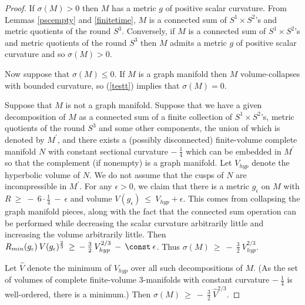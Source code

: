 \begin{proof}
If $\sigma(M) > 0$ then $M$ has a metric $g$ of positive scalar curvature.
From Lemmas \ref{pscempty} and \ref{finitetime}, $M$ is a connected sum of $S^1 \times S^2$'s and
metric quotients of the round $S^3$.
Conversely, if $M$ is a connected sum of $S^1 \times S^2$'s and
metric quotients of the round $S^3$ then $M$ admits a metric $g$ of
positive scalar curvature and so $\sigma(M) > 0$.

Now suppose that $\sigma(M) \le 0$.
If $M$ is a graph manifold then $M$ volume-collapses with bounded
curvature, so (\ref{testt}) implies that $\sigma(M) = 0$.

Suppose that $M$ is not a graph manifold. Suppose that we have
a given decomposition of $M$
as a connected sum
of a finite collection of $S^1 \times S^2$'s, metric quotients of the round
$S^3$ and some other components, the union of which is denoted by
$M^\prime$, and there exists a (possibly disconnected) finite-volume complete
manifold $N$ with constant sectional curvature $- \: \frac14$
which can be embedded in $M^\prime$ so that the
complement (if nonempty) is a graph manifold.
Let
$V_{hyp}$ denote the hyperbolic volume of $N$.  We do not
assume that the cusps of $N$ are incompressible in $M^\prime$.
For any $\epsilon > 0$, we claim that
there is a metric $g_\epsilon$ on $M$ with
$R \: \ge \: - \: 6 \cdot \frac14 \: - \: \epsilon$ and volume
$V(g_\epsilon) \: \le \: V_{hyp} + \epsilon$. This comes from
collapsing the graph manifold pieces, along with the
fact that the connected sum operation can be performed
while  decreasing the scalar curvature arbitrarily little and increasing
the volume arbitrarily little.
Then
$R_{min}(g_\epsilon) \: V(g_\epsilon)^{\frac23}
 \: \ge \: - \: \frac32 \: V_{hyp}^{2/3} \: - \: \const \:
\epsilon$. Thus
$\sigma(M) \: \ge \:
- \: \frac32 \: V_{hyp}^{2/3}$.

Let
$\widehat{V}$
denote the minimum of $V_{hyp}$ over
all such decompositions of $M$. (As the set of
volumes of complete finite-volume $3$-manifolds with constant curvature
$- \: \frac14$ is well-ordered, there is a minimum.)
Then
$\sigma(M) \: \ge \:
- \: \frac32 \: \widehat{V}^{2/3}$.


\end{proof}
